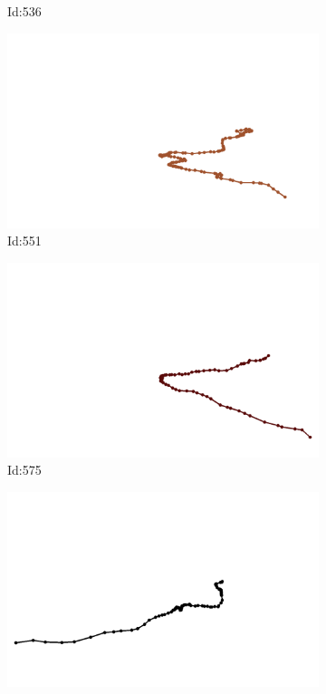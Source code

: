 \documentclass[12pt,twoside]{report}
\begin{document}
\begin{figure}
\begin{subfigure}[b]{0.20\textwidth}
\caption{Id:536}
\end{subfigure}
\begin{subfigure}[b]{0.20\textwidth}
\centering
\includegraphics[width=\textwidth]{../trajectories/551.png}
\caption{Id:551}
\end{subfigure}
\begin{subfigure}[b]{0.20\textwidth}
\centering
\includegraphics[width=\textwidth]{../trajectories/575.png}
\caption{Id:575}
\end{subfigure}
\begin{subfigure}[b]{0.20\textwidth}
\centering
\includegraphics[width=\textwidth]{../trajectories/591.png}

\end{subfigure}
\end{figure}
\end{document}
